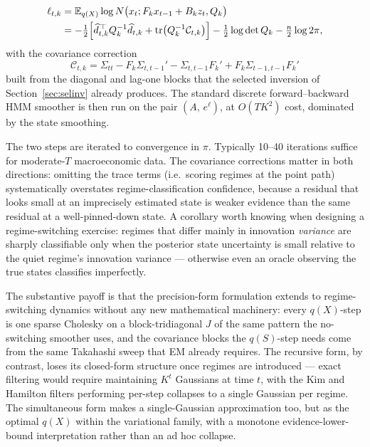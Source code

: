 \documentclass[11pt]{article}
\newcommand{\E}{\mathbb E}
\newcommand{\tr}{\operatorname{tr}}
\begin{document}
\begin{enumerate}[leftmargin=2em]
\begin{equation}
  \begin{split}
  \ell_{t,k}
  &=\E_{q(X)}\log N\bigl(x_t;F_kx_{t-1}+B_kz_t,Q_k\bigr)\\
  &=-\tfrac12\Bigl[\widehat d_{t,k}^{\,\top}Q_k^{-1}\widehat d_{t,k}
   +\tr\bigl(Q_k^{-1}\mathcal C_{t,k}\bigr)\Bigr]
   -\tfrac12\log\det Q_k-\tfrac n2\log 2\pi,
  \end{split}
  \end{equation}
  with the covariance correction
  \begin{equation}
  \mathcal C_{t,k}
  =\Sigma_{tt}-F_k\Sigma_{t,t-1}'-\Sigma_{t,t-1}F_k'
   +F_k\Sigma_{t-1,t-1}F_k'
  \end{equation}
  built from the diagonal and lag-one blocks that the selected
  inversion of Section~\ref{sec:selinv} already produces.  The
  standard discrete forward--backward HMM smoother is then run on the
  pair $(A,\,e^{\ell})$, at $O(TK^2)$ cost, dominated by the state
  smoothing.
\end{enumerate}
The two steps are iterated to convergence in $\pi$.  Typically 10--40
iterations suffice for moderate-$T$ macroeconomic data.  The
covariance corrections matter in both directions: omitting the trace
terms (i.e.\ scoring regimes at the point path) systematically
overstates regime-classification confidence, because a residual that
looks small at an imprecisely estimated state is weaker evidence than
the same residual at a well-pinned-down state.  A corollary worth
knowing when designing a regime-switching exercise: regimes that
differ mainly in innovation \emph{variance} are sharply classifiable
only when the posterior state uncertainty is small relative to the
quiet regime's innovation variance --- otherwise even an oracle
observing the true states classifies imperfectly.

The substantive payoff is that the precision-form formulation extends
to regime-switching dynamics without any new mathematical machinery:
every $q(X)$-step is one sparse Cholesky on a block-tridiagonal $J$ of
the same pattern the no-switching smoother uses, and the covariance
blocks the $q(S)$-step needs come from the same Takahashi sweep that
EM already requires.  The recursive form, by contrast, loses its
closed-form structure once regimes are introduced ---
exact filtering would require maintaining $K^t$ Gaussians at time $t$,
with the Kim and Hamilton filters performing per-step collapses to a
single Gaussian per regime.  The simultaneous form makes a
single-Gaussian approximation too, but as the optimal $q(X)$ within
the variational family, with a monotone evidence-lower-bound
interpretation rather than an ad hoc collapse.
\end{document}
